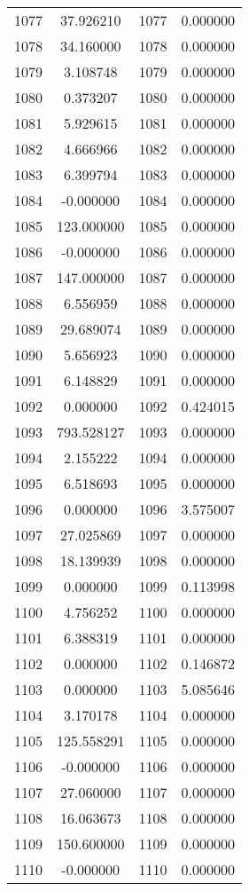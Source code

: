 \documentclass[12pt]{article}
\begin{document}
\begin{longtable}{@{}cccc@{}}
1077 & 37.926210 & 1077 & 0.000000 \\
1078 & 34.160000 & 1078 & 0.000000 \\
1079 & 3.108748 & 1079 & 0.000000 \\
1080 & 0.373207 & 1080 & 0.000000 \\
1081 & 5.929615 & 1081 & 0.000000 \\
1082 & 4.666966 & 1082 & 0.000000 \\
1083 & 6.399794 & 1083 & 0.000000 \\
1084 & -0.000000 & 1084 & 0.000000 \\
1085 & 123.000000 & 1085 & 0.000000 \\
1086 & -0.000000 & 1086 & 0.000000 \\
1087 & 147.000000 & 1087 & 0.000000 \\
1088 & 6.556959 & 1088 & 0.000000 \\
1089 & 29.689074 & 1089 & 0.000000 \\
1090 & 5.656923 & 1090 & 0.000000 \\
1091 & 6.148829 & 1091 & 0.000000 \\
1092 & 0.000000 & 1092 & 0.424015 \\
1093 & 793.528127 & 1093 & 0.000000 \\
1094 & 2.155222 & 1094 & 0.000000 \\
1095 & 6.518693 & 1095 & 0.000000 \\
1096 & 0.000000 & 1096 & 3.575007 \\
1097 & 27.025869 & 1097 & 0.000000 \\
1098 & 18.139939 & 1098 & 0.000000 \\
1099 & 0.000000 & 1099 & 0.113998 \\
1100 & 4.756252 & 1100 & 0.000000 \\
1101 & 6.388319 & 1101 & 0.000000 \\
1102 & 0.000000 & 1102 & 0.146872 \\
1103 & 0.000000 & 1103 & 5.085646 \\
1104 & 3.170178 & 1104 & 0.000000 \\
1105 & 125.558291 & 1105 & 0.000000 \\
1106 & -0.000000 & 1106 & 0.000000 \\
1107 & 27.060000 & 1107 & 0.000000 \\
1108 & 16.063673 & 1108 & 0.000000 \\
1109 & 150.600000 & 1109 & 0.000000 \\
1110 & -0.000000 & 1110 & 0.000000 \\

\end{longtable}
\end{document}
